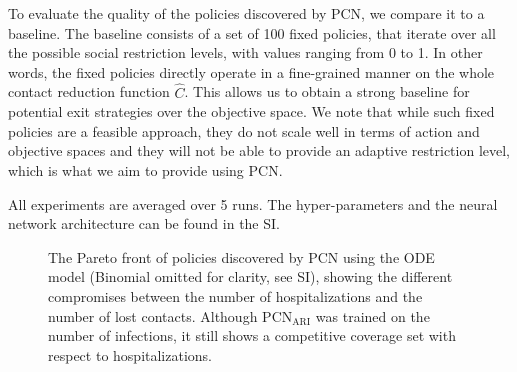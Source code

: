 \documentclass{article}
\begin{document}
To evaluate the quality of the policies discovered by PCN, we compare it to a baseline. The baseline consists of a set of 100 fixed policies, that iterate over all the possible social restriction levels, with values ranging from 0 to 1. In other words, the fixed policies directly operate in a fine-grained manner on the whole contact reduction function $\hat{C}$. This allows us to obtain a strong baseline for potential exit strategies over the objective space. We note that while such fixed policies are a feasible approach, they do not scale well in terms of action and objective spaces and they will not be able to provide an adaptive restriction level, which is what we aim to provide using PCN.

All experiments are averaged over 5 runs. The hyper-parameters and the neural network architecture can be found in the SI.

\begin{figure}
    \centering
    
\end{figure}

\begin{figure}
    \centering
    \caption{The Pareto front of policies discovered by PCN using the ODE model (Binomial omitted for clarity, see SI), showing the different compromises between the number of hospitalizations and the number of lost contacts. Although $\text{PCN}_\text{ARI}$ was trained on the number of infections, it still shows a competitive coverage set with respect to hospitalizations.}
    \label{fig:pareto-front}
\end{figure}
\end{document}
